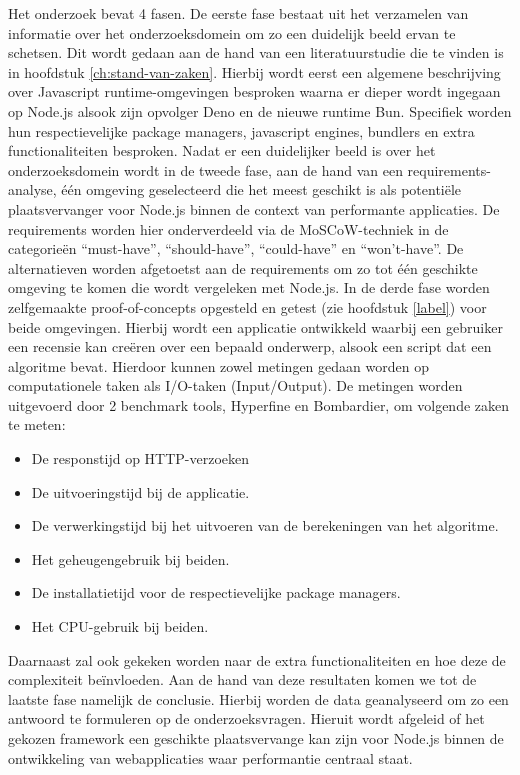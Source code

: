 Het onderzoek bevat 4 fasen. 
De eerste fase bestaat uit het verzamelen van informatie over het onderzoeksdomein om zo een duidelijk beeld ervan te schetsen.
Dit wordt gedaan aan de hand van een literatuurstudie die te vinden is in hoofdstuk \ref{ch:stand-van-zaken}. 
Hierbij wordt eerst een algemene beschrijving over Javascript runtime-omgevingen besproken waarna 
er dieper wordt ingegaan op Node.js alsook zijn opvolger Deno en de nieuwe runtime Bun. 
Specifiek worden hun respectievelijke package managers, javascript engines, bundlers en extra functionaliteiten besproken.
Nadat er een duidelijker beeld is over het onderzoeksdomein wordt in de tweede fase, aan de hand van een requirements-analyse, 
één omgeving geselecteerd die het meest geschikt is als potentiële plaatsvervanger voor Node.js binnen de context van performante applicaties.
De requirements worden hier onderverdeeld via de MoSCoW-techniek in de categorieën “must-have”, “should-have”, “could-have” en “won't-have”. 
De alternatieven worden afgetoetst aan de requirements om zo tot één geschikte omgeving te komen die wordt vergeleken met Node.js.
In de derde fase worden zelfgemaakte proof-of-concepts opgesteld en getest (zie hoofdstuk \ref{label}) voor beide omgevingen. 
Hierbij wordt een applicatie ontwikkeld waarbij een gebruiker
een recensie kan creëren over een bepaald onderwerp,
alsook een script dat een algoritme bevat. Hierdoor kunnen zowel metingen gedaan worden op computationele taken als I/O-taken (Input/Output).
De metingen worden uitgevoerd door 2 benchmark tools, Hyperfine en Bombardier, om volgende zaken te meten:
\begin{itemize}
    \item De responstijd op HTTP-verzoeken
    \item De uitvoeringstijd bij de applicatie.
    \item De verwerkingstijd bij het uitvoeren van de berekeningen van het algoritme.
    \item Het geheugengebruik bij beiden.
    \item De installatietijd voor de respectievelijke package managers.
    \item Het CPU-gebruik bij beiden.
\end{itemize}
Daarnaast zal ook gekeken worden naar de extra functionaliteiten en hoe deze de complexiteit beïnvloeden.
Aan de hand van deze resultaten komen we tot de laatste fase namelijk de conclusie. 
Hierbij worden de data geanalyseerd om zo een antwoord te formuleren op de onderzoeksvragen.
Hieruit wordt afgeleid of het gekozen framework een geschikte plaatsvervange kan zijn voor Node.js binnen 
de ontwikkeling van webapplicaties waar performantie centraal staat.
